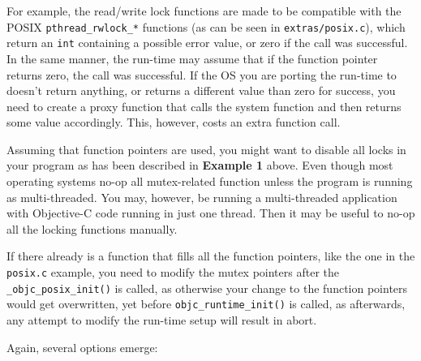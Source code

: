 \begin{itemize}
For example, the read/write lock functions are made to be compatible with the POSIX \verb=pthread_rwlock_*= functions (as can be seen in \verb=extras/posix.c=), which return an \verb=int= containing a possible error value, or zero if the call was successful. In the same manner, the run-time may assume that if the function pointer returns zero, the call was successful. If the OS you are porting the run-time to doesn't return anything, or returns a different value than zero for success, you need to create a proxy function that calls the system function and then returns some value accordingly. This, however, costs an extra function call.

\end{itemize}


Assuming that function pointers are used, you might want to disable all locks in your program as has been described in \textbf{Example 1} above. Even though most operating systems no-op all mutex-related function unless the program is running as multi-threaded. You may, however, be running a multi-threaded application with Objective-C code running in just one thread. Then it may be useful to no-op all the locking functions manually.

If there already is a function that fills all the function pointers, like the one in the \verb=posix.c= example, you need to modify the mutex pointers after the \verb=_objc_posix_init()= is called, as otherwise your change to the function pointers would get overwritten, yet before \verb=objc_runtime_init()= is called, as afterwards, any attempt to modify the run-time setup will result in abort.

Again, several options emerge:

